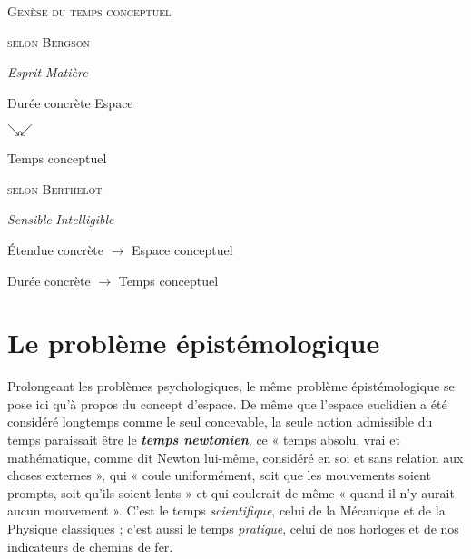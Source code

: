\vspace{0.4cm}
\begin{center}
\textsc{Genèse du temps conceptuel}
\end{center}

\vspace{0.4cm}
\begin{minipage}[c]{.35\linewidth}
\begin{center} \textsc{selon Bergson}
\vspace{0.7cm}

{\it Esprit} \hfill {\it Matière}
\vspace{0.2cm}

Durée concrète \hfill Espace

\vspace{0.2cm}
\hspace{1.7cm} $ \searrow \hfill \swarrow $ \hspace{0.7cm}
\vspace{0.2cm}

Temps conceptuel
\end{center}
\end{minipage}
\hfill
\begin{minipage}[c]{.45\linewidth}
\begin{center} \textsc{selon Berthelot}
\vspace{0.7cm}

{\it Sensible} \hfill {\it Intelligible}

\vspace{0.3cm}
Étendue concrète $\rightarrow$ Espace conceptuel

\vspace{0.7cm}
Durée concrète $\rightarrow$ Temps conceptuel
\end{center}
\end{minipage}

\section{Le problème épistémologique}%
Prolongeant les problèmes
psychologiques, le même problème épistémologique se pose
ici qu’à propos du concept d’espace. De même que l’espace euclidien
a été considéré longtemps comme le seul concevable, la seule notion
admissible du temps paraissait être le \textbf{\textit {temps newtonien}},
ce « temps
absolu, vrai et mathématique, comme dit Newton lui-même, considéré
en soi et sans relation aux choses externes », qui « coule uniformément,
soit que les mouvements soient prompts, soit qu’ils soient
lents » et qui coulerait de même « quand il n’y aurait aucun mouvement ».
C’est le temps {\it scientifique}, celui de la Mécanique et de la
Physique classiques ; c’est aussi le temps {\it pratique}, celui de nos horloges
et de nos indicateurs de chemins de fer.

